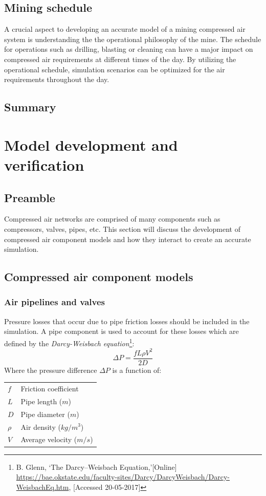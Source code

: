 	\subsection{Mining schedule}
		A crucial aspect to developing an accurate model of a mining compressed air system is understanding the the operational philosophy of the mine. The schedule for operations such as drilling,  blasting or cleaning can have a major impact on compressed air requirements at different times of the day. By utilizing the operational schedule, simulation scenarios can be optimized for the air requirements throughout the day.
	\subsection{Summary}
\section{Model development and verification}
	\subsection{Preamble}
	Compressed air networks are comprised of many components such as compressors, valves, pipes, etc. This section will discuss the development of compressed air component models and how they interact to create an accurate simulation.
	\subsection{Compressed air component models}
		\subsubsection{Air pipelines and valves}
		Pressure losses that occur due to pipe friction losses should be included in the simulation. A pipe component is used to account for these losses which are defined by the \textit{Darcy-Weisbach equation}\footnote{ B. Glenn, \enquote*{The Darcy–Weisbach Equation,}[Online] \url{https://bae.okstate.edu/faculty-sites/Darcy/DarcyWeisbach/Darcy-WeisbachEq.htm}, [Accessed 20-05-2017]}:
		$$\Delta P = \frac{f  L \rho V^2}{2 D}$$
		Where the pressure difference $\Delta P $ is a function of:\\
		\begin{tabular}{p{1.3cm}p{13cm}}
		$f$ & Friction coefficient  \\
		$L$ & Pipe length ($m$) \\
		$D$ & Pipe diameter ($m$) \\
		$\rho$ & Air density ($kg/m^3$)\\	
		$V$ & Average velocity ($m/s$) \\
		\end{tabular} 
	
